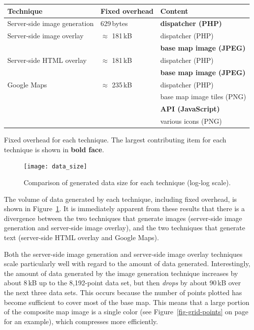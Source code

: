 \documentclass[acmnow]{acmtrans2m}
\begin{document}
\begin{acmtable}{11cm}
	\centering
	\begin{tabular}{lll}
		Technique						&	Fixed overhead		&	Content	\\
		\hline
		Server-side image generation	&	629\,bytes			&	\textbf{dispatcher (PHP)}\medskip	\\

		Server-side image overlay		&	\(\approx\) 181\,kB	&	dispatcher (PHP) \\
										&						&	\textbf{base map image (JPEG)}\medskip	\\

		Server-side HTML overlay		&	\(\approx\) 181\,kB	&	dispatcher (PHP) \\
										&						&	\textbf{base map image (JPEG)}\medskip	\\

		Google Maps						&	\(\approx\) 235\,kB	&	dispatcher (PHP) \\
										&						&	base map image tiles (PNG) \\
										&						&	\textbf{API (JavaScript)} \\
										&						&	various icons (PNG)	\\
	\end{tabular}
	\caption{Fixed overhead for each technique. The largest contributing
	item for each technique is shown in \textbf{bold face}.}
	\label{tab-overhead}
\end{acmtable}


\begin{figure}
	\centering
	\texttt{[image: data\_size]}
	\caption{Comparison of generated data size for each technique (log-log scale).}
	\label{fig-data-size}
\end{figure}


The volume of data generated by each technique, including fixed
overhead, is shown in Figure~\ref{fig-data-size}. It is immediately
apparent from these results that there is a divergence between the two
techniques that generate images (server-side image generation and
server-side image overlay), and the two techniques that generate text
(server-side HTML overlay and Google Maps).

Both the server-side image generation and server-side image overlay
techniques scale particularly well with regard to the amount of data
generated. Interestingly, the amount of data generated by the image
generation technique increases by about 8\,kB up to the 8,192-point data
set, but then \emph{drops} by about 90\,kB over the next three data
sets. This occurs because the number of points plotted has become
sufficient to cover most of the base map. This means that a large
portion of the composite map image is a single color (see
Figure~\ref{fig-grid-points} on page~\pageref{fig-grid-points} for an
example), which compresses more efficiently.
\end{document}
